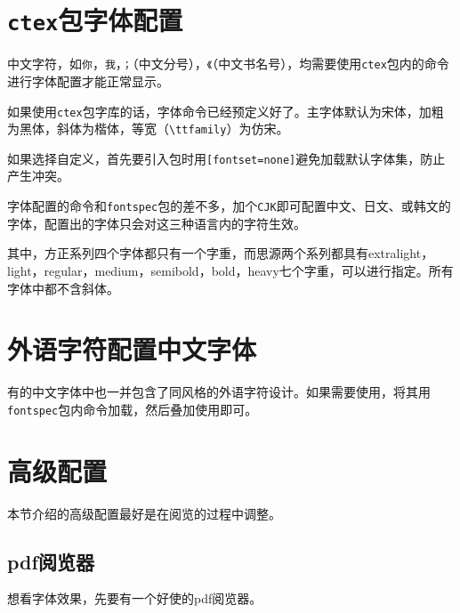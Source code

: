 \documentclass[10pt,openany]{book}
\begin{document}
\begin{sloppypar}
    \section{\texttt{ctex}包字体配置}

    中文字符，如\texttt{你}，\texttt{我}，\texttt{；}（中文分号），\texttt{《}（中文书名号），均需要使用\texttt{ctex}包内的命令进行字体配置才能正常显示。

    如果使用\texttt{ctex}包字库的话，字体命令已经预定义好了。主字体默认为宋体，加粗为黑体，斜体为楷体，等宽（\texttt{\textbackslash{}ttfamily}）为仿宋。

    

    如果选择自定义，首先要引入包时用\texttt{{[}fontset=none{]}}避免加载默认字体集，防止产生冲突。

    

    字体配置的命令和\texttt{fontspec}包的差不多，加个\texttt{CJK}即可配置中文、日文、或韩文的字体，配置出的字体只会对这三种语言内的字符生效。

    

    其中，方正系列四个字体都只有一个字重，而思源两个系列都具有extralight，light，regular，medium，semibold，bold，heavy七个字重，可以进行指定。所有字体中都不含斜体。

    \section{外语字符配置中文字体}

    有的中文字体中也一并包含了同风格的外语字符设计。如果需要使用，将其用\texttt{fontspec}包内命令加载，然后叠加使用即可。

    

    \section{高级配置}

    本节介绍的高级配置最好是在阅览的过程中调整。

    \subsection{pdf阅览器}

    想看字体效果，先要有一个好使的pdf阅览器。


\end{sloppypar}
\end{document}
